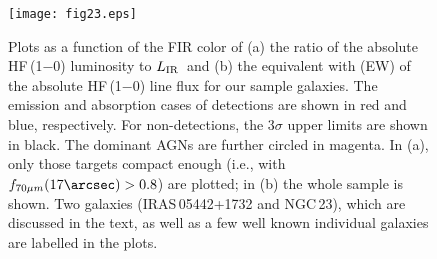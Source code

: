 \documentclass[preprint]{aastex}
\newcommand{\LIR}{\mbox{$L_{\rm IR}$}}
\begin{document}
\begin{figure}
\centering
\texttt{[image: fig23.eps]}
\caption{
Plots as a function of the FIR color of (a) the ratio of the absolute HF\,(1$-$0) luminosity to 
\LIR\ and (b) the equivalent with (EW) of the absolute HF\,(1$-$0) line flux for our sample 
galaxies.  The emission and absorption cases of detections are shown in red and blue, respectively.  
For non-detections, the 3$\sigma$ upper limits are shown in black.   The dominant AGNs are 
further circled in magenta.  In (a), only 
those targets compact enough (i.e., with $f_{70\mu m}(17\arcsec) > 0.8$) are plotted; in (b) 
the whole sample is shown. Two galaxies (IRAS\,05442+1732 and NGC\,23), which are discussed 
in the text, as well as a few well known individual galaxies are labelled in the plots. 
}
\label{Fig23}
\end{figure}
\clearpage









 

\end{document}
